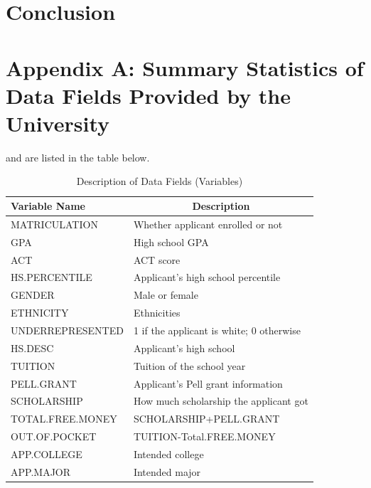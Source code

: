 \documentclass[12pt,english]{report}
\begin{document}
\chapter{Conclusion}

\appendix
\chapter{Appendix A: Summary Statistics of Data Fields Provided by the
University}  \label{app A}


and are listed in the table below.

\begin{table}[ht]
\centering
\caption{Description of Data Fields (Variables)}
\label{my-label}
\begin{tabular}{ll}
\hline
Variable Name     & \multicolumn{1}{c}{Description}      \\ \hline
MATRICULATION     & Whether applicant enrolled or not           	  \\
GPA               & High school GPA                                   \\
ACT               & ACT score                       					\\
HS.PERCENTILE     & Applicant's high school percentile         \\
GENDER            & Male or female                       \\
ETHNICITY         & Ethnicities                               \\
UNDERREPRESENTED  & 1 if the applicant is white; 0 otherwise       \\
HS.DESC           & Applicant's high school                       \\
TUITION           & Tuition of the school year                          \\
PELL.GRANT        & Applicant's Pell grant information       \\
SCHOLARSHIP       & How much scholarship the applicant got     \\
TOTAL.FREE.MONEY  & SCHOLARSHIP+PELL.GRANT                         \\
OUT.OF.POCKET     & TUITION-Total.FREE.MONEY              \\
APP.COLLEGE       & Intended college            \\
APP.MAJOR         & Intended major                \\ \hline
\end{tabular}
\end{table}
	
\end{document}
